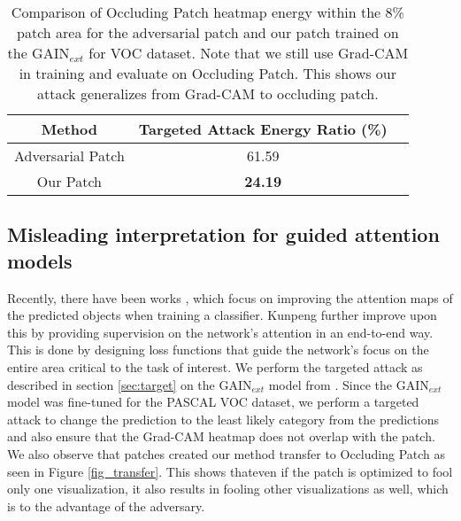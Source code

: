\documentclass[10pt,twocolumn,letterpaper]{article}
\begin{document}
\begin{table}[!t]
\centering
 \begin{tabular}{||c || c | c ||}
 \hline
 Method & \small{Targeted Attack Energy Ratio (\%)}\\[0.5ex]
 \hline\hline
 Adversarial Patch \cite{brown2017adversarial} & 61.59  \\
 \hline
 Our Patch & \textbf{24.19}  \\
 \hline
\end{tabular}
\newline
    \caption{Comparison of Occluding Patch \cite{zhou2014object} heatmap energy within the 8\% patch area for the adversarial patch \cite{brown2017adversarial} and our patch trained on the GAIN{$_{ext}$} \cite{kunpeng2018gain} for VOC dataset. Note that we still use Grad-CAM in training and evaluate on Occluding Patch. This shows our attack generalizes from Grad-CAM to occluding patch.
    }
    \label{table:comparison_patch_transfer_heatmap_GAIN}
\end{table}
\subsection{Misleading interpretation for guided attention models}
\label{improv_adv_exmaples_attention_models}
Recently, there have been works \cite{singh2017hide}, \cite{wei2017object} which focus on improving the attention maps of the predicted objects when training a classifier. Kunpeng \etal \cite{kunpeng2018gain} further improve upon this by providing supervision on the network's attention in an end-to-end way. This is done by designing loss functions that guide the network's focus on the entire area critical to the task of interest. We perform the targeted attack as described in section \ref{sec:target} on the GAIN{$_{ext}$} model from \cite{kunpeng2018gain}. Since the GAIN{$_{ext}$} model was fine-tuned for the PASCAL VOC dataset, we perform a targeted attack to change the prediction to the least likely category from the predictions and also ensure that the Grad-CAM heatmap does not overlap with the patch. We also observe that patches created our method transfer to Occluding Patch \cite{zhou2016learning} as seen in Figure \ref{fig_transfer}.  This shows thateven if the patch is optimized to fool only one visualization, it also results in fooling other visualizations as well, which is to the advantage of the adversary.
\end{document}
